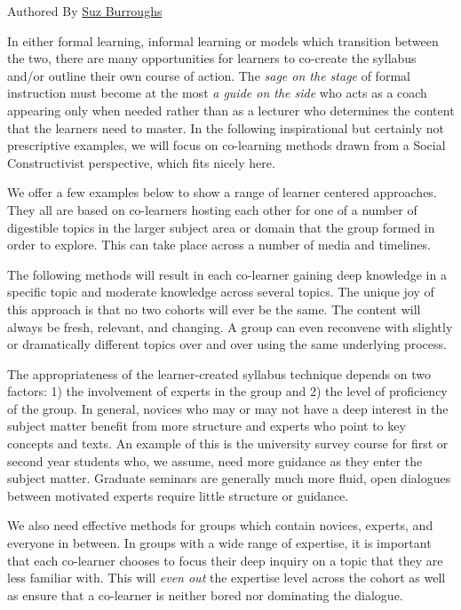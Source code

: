 Authored By \href{http://peeragogy.org/resources/meet-the-team/}{Suz
Burroughs}

In either formal learning, informal learning or models which transition
between the two, there are many opportunities for learners to co-create
the syllabus and/or outline their own course of action. The \emph{sage
on the stage} of formal instruction must become at the most \emph{a
guide on the side} who acts as a coach appearing only when needed rather
than as a lecturer who determines the content that the learners need to
master. In the following inspirational but certainly not prescriptive
examples, we will focus on co-learning methods drawn from a Social
Constructivist perspective, which fits nicely here.

We offer a few examples below to show a range of learner centered
approaches. They all are based on co-learners hosting each other for one
of a number of digestible topics in the larger subject area or domain
that the group formed in order to explore. This can take place across a
number of media and timelines.

The following methods will result in each co-learner gaining deep
knowledge in a specific topic and moderate knowledge across several
topics. The unique joy of this approach is that no two cohorts will ever
be the same. The content will always be fresh, relevant, and changing. A
group can even reconvene with slightly or dramatically different topics
over and over using the same underlying process.

The appropriateness of the learner-created syllabus technique depends on
two factors: 1) the involvement of experts in the group and 2) the level
of proficiency of the group. In general, novices who may or may not have
a deep interest in the subject matter benefit from more structure and
experts who point to key concepts and texts. An example of this is the
university survey course for first or second year students who, we
assume, need more guidance as they enter the subject matter. Graduate
seminars are generally much more fluid, open dialogues between motivated
experts require little structure or guidance.

We also need effective methods for groups which contain novices,
experts, and everyone in between. In groups with a wide range of
expertise, it is important that each co-learner chooses to focus their
deep inquiry on a topic that they are less familiar with. This will
\emph{even out} the expertise level across the cohort as well as ensure
that a co-learner is neither bored nor dominating the dialogue.

